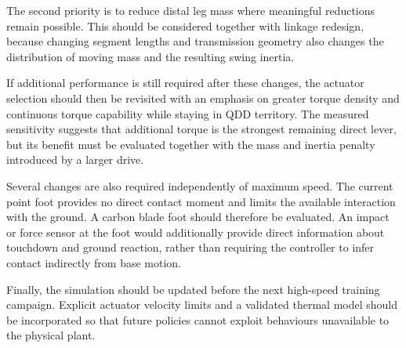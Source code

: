 The second priority is to reduce distal leg mass where meaningful reductions remain possible.
This should be considered together with linkage redesign, because changing segment lengths and transmission geometry also changes the distribution of moving mass and the resulting swing inertia.

If additional performance is still required after these changes, the actuator selection should then be revisited with an emphasis on greater torque density and continuous torque capability while staying in QDD territory.
The measured sensitivity suggests that additional torque is the strongest remaining direct lever, but its benefit must be evaluated together with the mass and inertia penalty introduced by a larger drive.

Several changes are also required independently of maximum speed.
The current point foot provides no direct contact moment and limits the available interaction with the ground.
A carbon blade foot should therefore be evaluated.
An impact or force sensor at the foot would additionally provide direct information about touchdown and ground reaction, rather than requiring the controller to infer contact indirectly from base motion.

Finally, the simulation should be updated before the next high-speed training campaign.
Explicit actuator velocity limits and a validated thermal model should be incorporated so that future policies cannot exploit behaviours unavailable to the physical plant.
